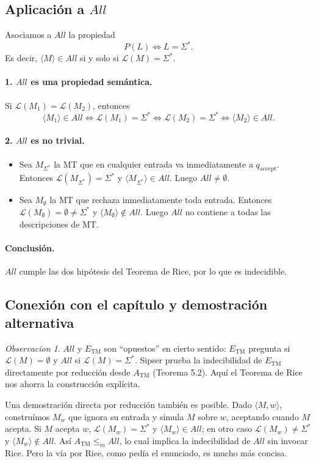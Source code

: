 \documentclass[11pt,a4paper]{article}
\theoremstyle{plain}
\theoremstyle{definition}
\theoremstyle{remark}
\newtheorem*{observacion}{Observacion}
\newcommand{\TM}{\mathrm{TM}}
\newcommand{\enc}[1]{\langle #1\rangle}
\newcommand{\encMw}{\langle M, w\rangle}
\newcommand{\lang}{\mathcal{L}}
\newcommand{\Sstar}{\Sigma^{*}}
\newcommand{\redm}{\le_{m}}
\newcommand{\qaccept}{q_{\text{accept}}}
\newcommand{\ATM}{A_{\TM}}
\newcommand{\ETM}{E_{\TM}}
\newcommand{\ALL}{\mathit{All}}
\begin{document}
\subsection*{Aplicaci\'on a $\ALL$}

Asociamos a $\ALL$ la propiedad
\[
  P(L) \iff L = \Sstar.
\]
Es decir, $\enc{M}\in\ALL$ si y solo si $\lang(M)=\Sstar$.

\paragraph{1. $\ALL$ es una propiedad sem\'antica.}
Si $\lang(M_1)=\lang(M_2)$, entonces
\[
  \enc{M_1}\in\ALL
  \iff \lang(M_1)=\Sstar
  \iff \lang(M_2)=\Sstar
  \iff \enc{M_2}\in\ALL.
\]

\paragraph{2. $\ALL$ es no trivial.}
\begin{itemize}
  \item Sea $M_{\Sstar}$ la MT que en cualquier entrada va inmediatamente
        a $\qaccept$. Entonces $\lang(M_{\Sstar})=\Sstar$ y
        $\enc{M_{\Sstar}}\in\ALL$. Luego $\ALL\neq\emptyset$.
  \item Sea $M_{\emptyset}$ la MT que rechaza inmediatamente toda entrada.
        Entonces $\lang(M_{\emptyset})=\emptyset\neq\Sstar$ y
        $\enc{M_{\emptyset}}\notin\ALL$. Luego $\ALL$ no contiene a todas las
        descripciones de MT.
\end{itemize}

\paragraph{Conclusi\'on.}
$\ALL$ cumple las dos hip\'otesis del Teorema de Rice, por lo que es
indecidible.

\begin{center}\fbox{$\ALL = \{\enc{M}\mid \lang(M)=\Sstar\}$ es indecidible.}\end{center}

\subsection*{Conexi\'on con el cap\'itulo y demostraci\'on alternativa}

\begin{observacion}
$\ALL$ y $\ETM$ son ``opuestos'' en cierto sentido: $\ETM$ pregunta si
$\lang(M)=\emptyset$ y $\ALL$ si $\lang(M)=\Sstar$. Sipser prueba la
indecibilidad de $\ETM$ directamente por reducci\'on desde $\ATM$
(Teorema 5.2). Aqu\'i el Teorema de Rice nos ahorra la construcci\'on
expl\'icita.

Una demostraci\'on directa por reducci\'on tambi\'en es posible. Dado
$\encMw$, constru\'imos $M_w$ que ignora su entrada y simula $M$ sobre
$w$, aceptando cuando $M$ acepta. Si $M$ acepta $w$, $\lang(M_w)=\Sstar$
y $\enc{M_w}\in\ALL$; en otro caso $\lang(M_w)\neq\Sstar$ y
$\enc{M_w}\notin\ALL$. As\'i $\ATM\redm\ALL$, lo cual implica la
indecibilidad de $\ALL$ sin invocar Rice. Pero la v\'ia por Rice, como
ped\'ia el enunciado, es mucho m\'as concisa.
\end{observacion}
\end{document}
